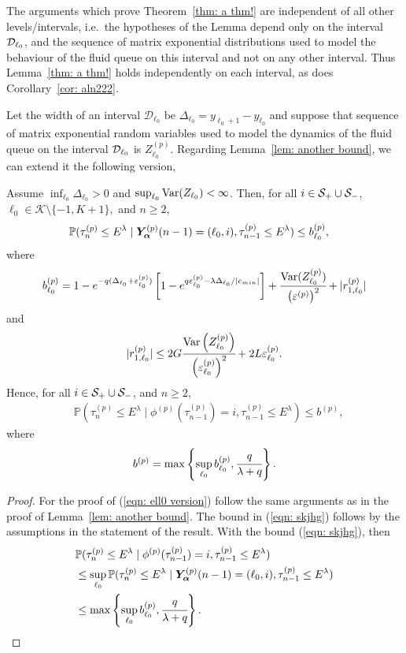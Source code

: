 The arguments which prove Theorem~\ref{thm: a thm!} are independent of all other levels/intervals, i.e.~the hypotheses of the Lemma depend only on the interval \(\mathcal{D}_{\ell_0}\), and the sequence of matrix exponential distributions used to model the behaviour of the fluid queue on this interval and not on any other interval. Thus Lemma~\ref{thm: a thm!} holds independently on each interval, as does Corollary~\ref{cor: aln222}.

Let the width of an interval \(\mathcal D_{\ell_0}\) be \(\Delta_{\ell_0}=y_{\ell_0+1}-y_{\ell_0}\) and suppose that sequence of matrix exponential random variables used to model the dynamics of the fluid queue on the interval \(\mathcal{D}_{\ell_0}\) is \(Z_{\ell_0}^{(p)}\). Regarding Lemma~\ref{lem: another bound}, we can extend it the following version, 
\begin{lem}\label{lem: another bound sdfg}
	Assume \(\inf_{\ell_0}\Delta_{\ell_0}>0\) and \(\sup_{\ell_0}\mathrm{Var}(Z_{\ell_0})<\infty\). Then, for all \(i\in\mathcal S_+\cup \mathcal{S}_-\), \(\ell_0\in\mathcal K\setminus\{-1,K+1\},\) and \(n\geq 2\), 
	\begin{align}
		&\mathbb P(\tau_n^{(p)}\leq E^\lambda \mid \bm{Y}_{\bm{\alpha}}^{(p)}(n-1) = (\ell_0,i), \tau_{n-1}^{(p)}\leq  E^\lambda ) \leq b_{\ell_0}^{(p)},\label{eqn: ell0 version}
	\end{align}
	where 
	\[b_{\ell_0}^{(p)} = 1-e^{-q(\Delta_{\ell_0}+\varepsilon_{\ell_0}^{(p)})}\left[1-e^{q\varepsilon_{\ell_0}^{(p)}-\lambda \Delta_{\ell_0}/|c_{min}|}\right] + \cfrac{\mathrm{Var}(Z_{\ell_0}^{(p)})}{\left(\varepsilon^{(p)}\right)^2} + |r_{1,\ell_0}^{(p)}| \]
	and  
	\[|r_{1,\ell_0}^{(p)}|\leq 2G\cfrac{\mathrm{Var} \left(Z_{\ell_0}^{(p)}\right)}{\left(\varepsilon_{\ell_0}^{(p)}\right)^2} + 2L\varepsilon_{\ell_0}^{(p)}.\]
	Hence, for all \(i\in\mathcal S_+\cup \mathcal{S}_-\), and \(n\geq 2\), 
	\begin{align}
		&\mathbb P(\tau_n^{(p)}\leq E^\lambda \mid \phi^{(p)}(\tau_{n-1}^{(p)})=i, \tau_{n-1}^{(p)}\leq  E^\lambda ) \leq b^{(p)}, \label{eqn: skjhg}
	\end{align}
	where 
	\[b^{(p)} = \max\left\{\sup_{\ell_0}b_{\ell_0}^{(p)}, \cfrac{q}{\lambda + q}\right\}.\]
\end{lem}
\begin{proof}
	For the proof of (\ref{eqn: ell0 version}) follow the same arguments as in the proof of Lemma~\ref{lem: another bound}. The bound in (\ref{eqn: skjhg}) follows by the assumptions in the statement of the result. With the bound (\ref{eqn: skjhg}), then
	\begin{align*}
		&\mathbb P(\tau_n^{(p)}\leq E^\lambda \mid \phi^{(p)}(\tau_{n-1}^{(p)})=i, \tau_{n-1}^{(p)}\leq  E^\lambda ) 
		\\&\leq \sup_{\ell_0} \mathbb P(\tau_n^{(p)}\leq E^\lambda \mid \bm{Y}_{\bm{\alpha}}^{(p)}(n-1) = (\ell_0, i), \tau_{n-1}^{(p)}\leq  E^\lambda ) 
		\\&\leq \max\left\{\sup_{\ell_0}b_{\ell_0}^{(p)}, \cfrac{q}{\lambda + q}\right\}.
	\end{align*}
\end{proof}

